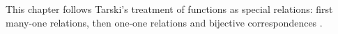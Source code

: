 \begin{remark*}
This chapter follows Tarski's treatment of functions as special relations:
first many-one relations, then one-one relations and bijective
correspondences \cite{Tarski1941IntroductionLogic}.
\end{remark*}


